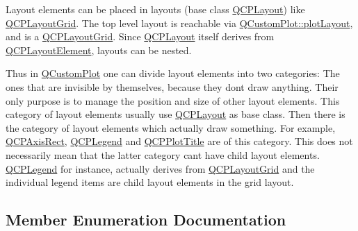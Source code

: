 Layout elements can be placed in layouts (base class \hyperlink{class_q_c_p_layout}{Q\+C\+P\+Layout}) like \hyperlink{class_q_c_p_layout_grid}{Q\+C\+P\+Layout\+Grid}. The top level layout is reachable via \hyperlink{class_q_custom_plot_afd280d4d621ae64a106543a545c508d7}{Q\+Custom\+Plot\+::plot\+Layout}, and is a \hyperlink{class_q_c_p_layout_grid}{Q\+C\+P\+Layout\+Grid}. Since \hyperlink{class_q_c_p_layout}{Q\+C\+P\+Layout} itself derives from \hyperlink{class_q_c_p_layout_element}{Q\+C\+P\+Layout\+Element}, layouts can be nested.

Thus in \hyperlink{class_q_custom_plot}{Q\+Custom\+Plot} one can divide layout elements into two categories\+: The ones that are invisible by themselves, because they don\textquotesingle{}t draw anything. Their only purpose is to manage the position and size of other layout elements. This category of layout elements usually use \hyperlink{class_q_c_p_layout}{Q\+C\+P\+Layout} as base class. Then there is the category of layout elements which actually draw something. For example, \hyperlink{class_q_c_p_axis_rect}{Q\+C\+P\+Axis\+Rect}, \hyperlink{class_q_c_p_legend}{Q\+C\+P\+Legend} and \hyperlink{class_q_c_p_plot_title}{Q\+C\+P\+Plot\+Title} are of this category. This does not necessarily mean that the latter category can\textquotesingle{}t have child layout elements. \hyperlink{class_q_c_p_legend}{Q\+C\+P\+Legend} for instance, actually derives from \hyperlink{class_q_c_p_layout_grid}{Q\+C\+P\+Layout\+Grid} and the individual legend items are child layout elements in the grid layout. 

\subsection{Member Enumeration Documentation}
